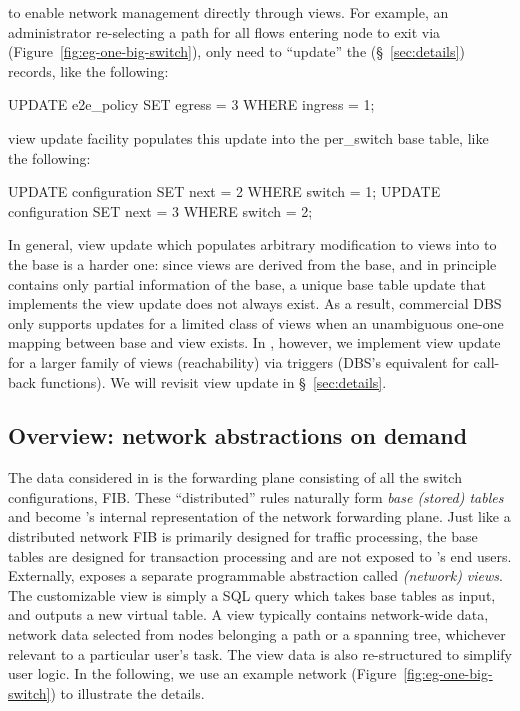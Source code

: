  to enable network management directly
through views. For example, an administrator re-selecting a path for
all flows entering node  to exit via 
(Figure~\ref{fig:eg-one-big-switch}), only need to ``update'' the
 (\S~\ref{sec:details}) records, like the
following:
\begin{sql}
UPDATE e2e_policy SET egress = 3 WHERE ingress = 1;
\end{sql}
\Sys view update facility populates this update into the per\_switch  base table, like the following:
\begin{sql}
UPDATE configuration SET next = 2 WHERE switch = 1;
UPDATE configuration SET next = 3 WHERE switch = 2;
\end{sql}
In general, view update which populates arbitrary modification to
views into to the base is a harder one: since views are derived from
the base, and in principle contains only partial information of the
base, a unique base table update that implements the view update does
not always exist. As a result, commercial DBS only supports updates
for a limited class of views when an unambiguous one-one mapping
between base and view exists.  In \Sys, however, we implement view
update for a larger family of views (\eg reachability) via triggers
(DBS's equivalent for call-back functions). We will revisit view
update in \S~\ref{sec:details}.




\subsection{Overview: network abstractions on demand}


The data considered in \Sys is the forwarding plane consisting of all
the switch configurations, \ie FIB.  These ``distributed'' rules
naturally form \Sys \textit{base (stored) tables} and become \Sys's
internal representation of the network forwarding plane. Just like a
distributed network FIB is primarily designed for traffic processing,
the base tables are designed for transaction processing and are not exposed
to \Sys's end users. Externally, \Sys exposes a separate programmable
abstraction called \textit{(network)
  views}.  %
The customizable view is simply a SQL query which takes base tables as
input, and outputs a new virtual table. A view typically
contains network-wide data, \eg network data selected from nodes
belonging a path or a spanning tree, whichever relevant to a
particular user's task. The view data is also re-structured to simplify
user logic. In the following, we use an example network
(Figure~\ref{fig:eg-one-big-switch}) to illustrate the details.

